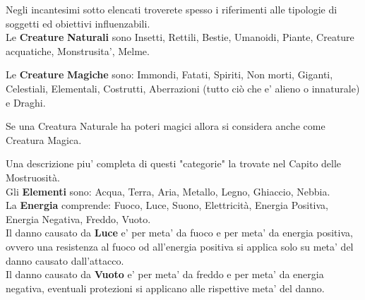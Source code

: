 Negli incantesimi sotto elencati troverete spesso i riferimenti alle tipologie di soggetti ed obiettivi influenzabili.\\

Le \textbf{Creature} \textbf{Naturali} sono Insetti, Rettili, Bestie, Umanoidi, Piante, Creature acquatiche, Monstrusita', Melme.

Le \textbf{Creature} \textbf{Magiche} sono: Immondi, Fatati, Spiriti, Non morti, Giganti, Celestiali, Elementali, Costrutti, Aberrazioni (tutto ciò che e' alieno o innaturale) e Draghi.

Se una Creatura Naturale ha poteri magici allora si considera anche come Creatura Magica.

Una descrizione piu' completa di questi "categorie" la trovate nel Capito delle Mostruosità.\\

Gli \textbf{Elementi} sono: Acqua, Terra, Aria, Metallo, Legno, Ghiaccio, Nebbia.\\
La \textbf{Energia} comprende: Fuoco, Luce, Suono, Elettricità, Energia Positiva, Energia Negativa, Freddo, Vuoto.\\
Il danno causato da \textbf{Luce} e' per meta' da fuoco e per meta' da energia positiva, ovvero una resistenza al fuoco od all'energia positiva si applica solo su meta' del danno causato dall'attacco.\\
Il danno causato da \textbf{Vuoto} e' per meta' da freddo e per meta' da energia negativa, eventuali protezioni si applicano alle rispettive meta' del danno.\\

\pagebreak


